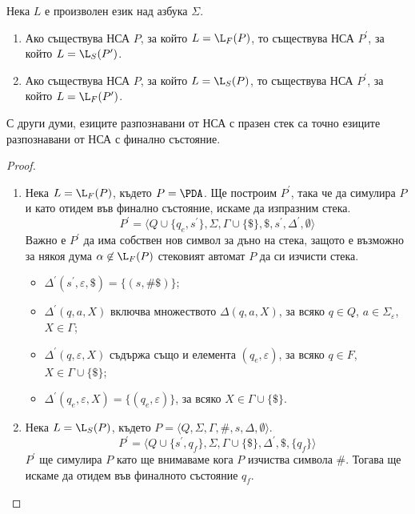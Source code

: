 \begin{thm}
  Нека $L$ е произволен език над азбука $\Sigma$.
  \begin{enumerate}[1)]
  \item 
    Ако съществува НСА $P$, за който $L = \L_F(P)$, то съществува НСА $P^\prime$, за който $L = \L_S(P^\prime)$.
  \item
    Ако съществува НСА $P$, за който $L = \L_S(P)$, то съществува НСА $P^\prime$, за който $L = \L_F(P^\prime)$.
  \end{enumerate}
  С други думи, езиците разпознавани от НСА с празен стек са точно езиците разпознавани от НСА с финално състояние.
\end{thm}
\begin{proof}
  \begin{enumerate}[1)]
  \item 
    Нека $L = \L_F(P)$, където $P = \PDA$.
    Ще построим $P^\prime$, така че да симулира $P$ и като отидем във финално състояние, искаме да изпразним стека.
    \[P^\prime = \langle{Q\cup\{q_e,s^\prime\},\Sigma,\Gamma \cup \{\$\},\$,s^\prime,\Delta^\prime,\emptyset}\rangle\]
    Важно е $P^\prime$ да има собствен нов символ за дъно на стека, защото е възможно за някоя дума $\alpha \not\in \L_F(P)$
    стековият автомат $P$ да си изчисти стека.
    \begin{itemize}
    \item 
      $\Delta^\prime(s^\prime,\varepsilon,\$) = \{(s,\#\$)\}$;
    \item
      $\Delta^\prime(q,a,X)$ включва множеството $\Delta(q,a,X)$, за всяко $q\in Q$, $a\in\Sigma_\varepsilon$, $X\in\Gamma$;
    \item
      $\Delta^\prime(q,\varepsilon,X)$ съдържа също и елемента $(q_e,\varepsilon)$, за всяко $q\in F$, $X \in \Gamma \cup \{\$\}$;
    \item
      $\Delta^\prime(q_e,\varepsilon,X) = \{(q_e,\varepsilon)\}$, за всяко $X \in \Gamma \cup \{\$\}$.
    \end{itemize}
  \item
    Нека $L = \L_S(P)$, където $P = \langle{Q,\Sigma,\Gamma,\#,s,\Delta,\emptyset}\rangle$.
    \[P^\prime = \langle{Q\cup\{s^\prime,q_f\}, \Sigma, \Gamma \cup \{\$\}, \Delta^\prime, \$, \{q_f\}}\rangle\]
    $P^\prime$ ще симулира $P$ като ще внимаваме кога $P$ изчиства символа $\#$. Тогава ще искаме да отидем във финалното състояние $q_f$.

\end{enumerate}
\end{proof}

